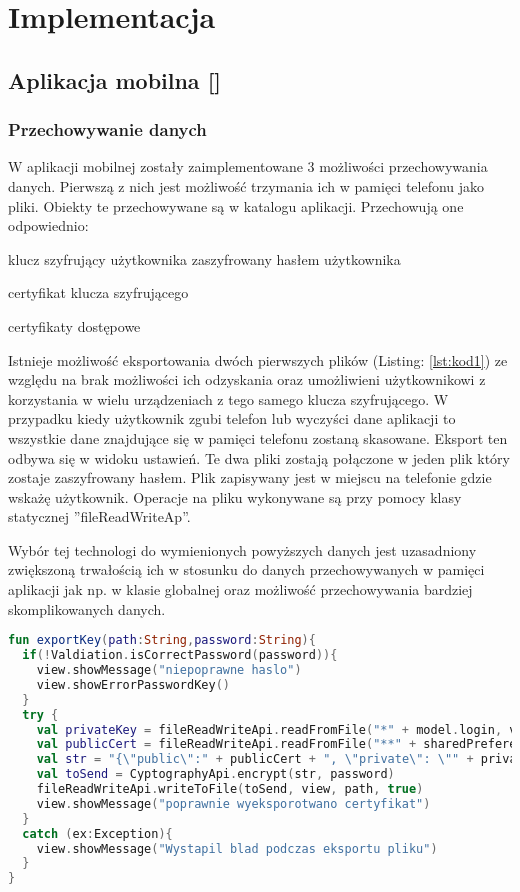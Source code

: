 \newpage\section{Implementacja} \label{sec:implementacja}
\subsection[Aplikacja mobilna]{Aplikacja mobilna [\StudentB]}
	\subsubsection{Przechowywanie danych}
	W aplikacji mobilnej zostały zaimplementowane 3 możliwości przechowywania danych. Pierwszą z nich jest możliwość trzymania ich w pamięci telefonu jako pliki. Obiekty te przechowywane są w katalogu aplikacji. Przechowują one odpowiednio:
	\begin{itemize*}
	\item	klucz szyfrujący użytkownika zaszyfrowany hasłem użytkownika
	\item certyfikat klucza szyfrującego 
	\item certyfikaty dostępowe
	\end{itemize*}	
	Istnieje możliwość eksportowania dwóch pierwszych plików (Listing: \ref{lst:kod1}) ze względu na brak możliwości ich odzyskania oraz umożliwieni użytkownikowi z korzystania w wielu urządzeniach z tego samego klucza szyfrującego. W przypadku kiedy użytkownik zgubi telefon lub  wyczyści dane aplikacji to wszystkie dane znajdujące się w pamięci telefonu zostaną skasowane. Eksport ten odbywa się w widoku ustawień. Te dwa pliki zostają połączone w jeden plik który zostaje zaszyfrowany hasłem. Plik zapisywany jest w miejscu na telefonie gdzie wskażę użytkownik.  Operacje na pliku wykonywane są przy pomocy klasy statycznej ''fileReadWriteAp''.
	
	Wybór  tej technologi do wymienionych powyższych danych jest uzasadniony zwiększoną trwałością ich w stosunku do danych przechowywanych w pamięci aplikacji jak np.  w klasie globalnej oraz możliwość przechowywania bardziej skomplikowanych danych.
	
	\begin{lstlisting}[caption={Funkcja eksportująca klucz szyfrujący.}, label={lst:kod1}, language=Kotlin]
fun exportKey(path:String,password:String){
  if(!Valdiation.isCorrectPassword(password)){
    view.showMessage("niepoprawne haslo")
    view.showErrorPasswordKey()
  }
  try {
    val privateKey = fileReadWriteApi.readFromFile("*" + model.login, view)
    val publicCert = fileReadWriteApi.readFromFile("**" + sharedPreferenceApi.getString(view, EnumChoice.login), view)	
    val str = "{\"public\":" + publicCert + ", \"private\": \"" + privateKey + "\"}"
    val toSend = CyptographyApi.encrypt(str, password)
    fileReadWriteApi.writeToFile(toSend, view, path, true)
    view.showMessage("poprawnie wyeksporotwano certyfikat")
  }
  catch (ex:Exception){
    view.showMessage("Wystapil blad podczas eksportu pliku")
  }
}
	\end{lstlisting}	
		
